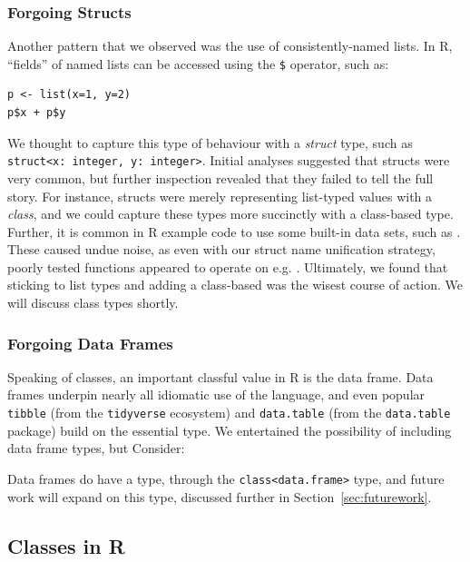 \documentclass[acmsmall,review,anonymous]{acmart}\settopmatter{printfolios=true,printccs=false,printacmref=false}
\newcommand{\code}[1]{{\lstinline[style=Rin]!#1!}\xspace}
\begin{document}
%
%
\subsubsection{Forgoing Structs}

Another pattern that we observed was the use of consistently-named lists.
In R, ``fields'' of named lists can be accessed using the \code{$} operator, such as:
\begin{lstlisting}
p <- list(x=1, y=2)
p$x + p$y
\end{lstlisting}
We thought to capture this type of behaviour with a {\it struct} type, such as \code{struct<x: integer, y: integer>}.
Initial analyses suggested that structs were very common, but further inspection revealed that they failed to tell the full story.
For instance,  structs were merely representing list-typed values with a {\it class}, and we could capture these types more succinctly with a class-based type.
Further, it is common in R example code to use some built-in data sets, such as .
These caused undue noise, as even with our struct name unification strategy, poorly tested functions appeared to operate on e.g. .
Ultimately, we found that sticking to list types and adding a class-based was the wisest course of action.
We will discuss class types shortly.

%
%
\subsubsection{Forgoing Data Frames}

Speaking of classes, an important classful value in R is the data frame.
Data frames underpin nearly all idiomatic use of the language, and even popular \code{tibble} (from the \code{tidyverse} ecosystem) and \code{data.table} (from the \code{data.table} package) build on the essential type.
We entertained the possibility of including data frame types, but 
Consider: 

Data frames do have a type, through the \code{class<data.frame>} type, and future work will expand on this type, discussed further in Section~\ref{sec:futurework}.

%
%
%
%
\subsection{Classes in R}
\end{document}
